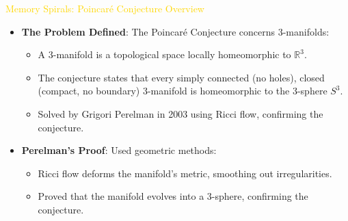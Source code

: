 \textcolor{gold}{ Memory Spirals: Poincaré Conjecture Overview } \\
\begin{itemize}
    \item \texttt{} \textbf{The Problem Defined}: The Poincaré Conjecture concerns 3-manifolds:
    \begin{itemize}
        \item A 3-manifold is a topological space locally homeomorphic to \(\mathbb{R}^3\).
        \item The conjecture states that every simply connected (no holes), closed (compact, no boundary) 3-manifold is homeomorphic to the 3-sphere \(S^3\).
        \item Solved by Grigori Perelman in 2003 using Ricci flow, confirming the conjecture.
    \end{itemize}
    \item \texttt{} \textbf{Perelman’s Proof}: Used geometric methods:
    \begin{itemize}
        \item Ricci flow deforms the manifold’s metric, smoothing out irregularities.
        \item Proved that the manifold evolves into a 3-sphere, confirming the conjecture.
    \end{itemize}
\end{itemize}

